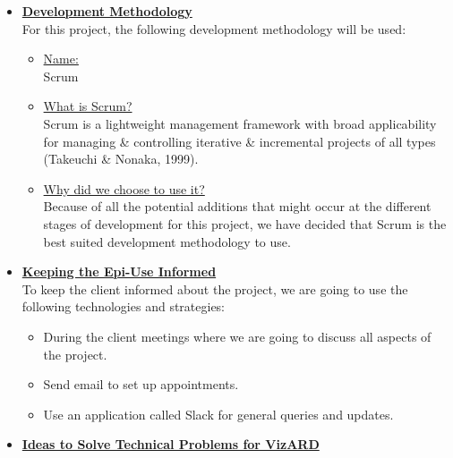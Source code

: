 \documentclass[a4paper,12pt]{article}
\begin{document}
\begin{itemize}
\item {\large \underline{\textbf{Development Methodology}}}\\[0.2cm]
For this project, the following development methodology will be used:

	\begin{itemize}
 		\item \underline{Name:}
		\\[0.1cm]
		 Scrum
		\item  \underline{What is Scrum?}
		\\[0.1cm]
		Scrum is a lightweight management framework with broad applicability for managing \& controlling iterative \& 				incremental projects of all types (Takeuchi \& Nonaka, 1999).
		\item \underline{Why did we choose to use it?}
		\\[0.1cm]
		Because of all the potential additions that might occur at the different stages of development for this project, we 			have decided that Scrum is the best suited development methodology to use.
	\end{itemize}
\bigskip

\item {\large \underline{\textbf{Keeping the Epi-Use Informed}}}\\[0.2cm]
To keep the client informed about the project, we are going to use the following technologies and strategies:

	\begin{itemize}
	\item During the client meetings where we are going to discuss all aspects of the project.
	\item Send email to set up appointments.
	\item Use an application called Slack for general queries and updates.
	\end{itemize} 

\bigskip
\item {\large \underline{\textbf{Ideas to Solve Technical Problems for VizARD}}}\\[0.2cm]


\end{itemize}
\end{document}
